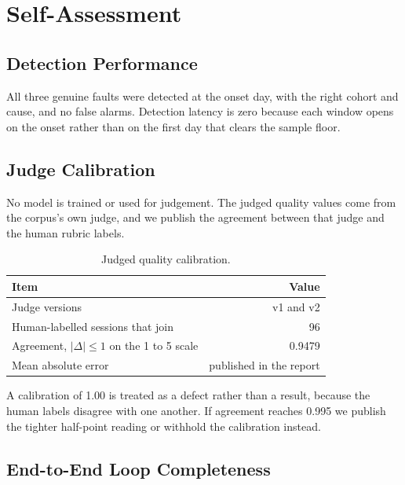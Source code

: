 \documentclass[8pt,twocolumn,a4paper]{extarticle}
\begin{document}

\section{Self-Assessment}

\subsection{Detection Performance}

All three genuine faults were detected at the onset day, with the right
cohort and cause, and no false alarms. Detection latency is zero because
each window opens on the onset rather than on the first day that clears
the sample floor.

\subsection{Judge Calibration}

No model is trained or used for judgement. The judged quality values
come from the corpus's own judge, and we publish the agreement between
that judge and the human rubric labels.

\begin{table}[H]
\centering
\caption{Judged quality calibration.}
\label{tab:calibration}
\small
\begin{tabularx}{\columnwidth}{@{}X r@{}}
\toprule
\textbf{Item} & \textbf{Value} \\
\midrule
Judge versions & v1 and v2 \\
Human-labelled sessions that join & 96 \\
Agreement, $|\Delta| \leq 1$ on the 1 to 5 scale & 0.9479 \\
Mean absolute error & published in the report \\
\bottomrule
\end{tabularx}
\end{table}

A calibration of 1.00 is treated as a defect rather than a result,
because the human labels disagree with one another. If agreement
reaches 0.995 we publish the tighter half-point reading or withhold the
calibration instead.

\subsection{End-to-End Loop Completeness}
\end{document}
